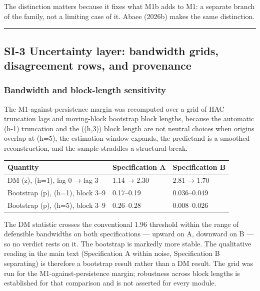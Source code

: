 \documentclass[11pt]{article}
\begin{document}
The distinction matters because it fixes what M1b adds to M1: a separate
branch of the family, not a limiting case of it. Abaee (2026b) makes the
same distinction.

\begin{center}\rule{0.5\linewidth}{0.5pt}\end{center}

\subsection{SI-3 Uncertainty layer: bandwidth grids, disagreement rows,
and
provenance}\label{si-3-uncertainty-layer-bandwidth-grids-disagreement-rows-and-provenance}

\subsubsection{Bandwidth and block-length
sensitivity}\label{bandwidth-and-block-length-sensitivity}

The M1-against-persistence margin was recomputed over a grid of HAC
truncation lags and moving-block bootstrap block lengths, because the
automatic (h-1) truncation and the (\max(h,3)) block length are not
neutral choices when origins overlap at (h=5), the estimation window
expands, the predictand is a smoothed reconstruction, and the sample
straddles a structural break.

{\def\LTcaptype{none} %
\begin{longtable}[]{@{}lll@{}}
\toprule\noalign{}
Quantity & Specification A & Specification B \\
\midrule\noalign{}
\endhead
\bottomrule\noalign{}
\endlastfoot
DM (z), (h=1), lag 0 → lag 3 & 1.14 → 2.30 & 2.81 → 1.70 \\
Bootstrap (p), (h=1), block 3--9 & 0.17--0.19 & 0.036--0.049 \\
Bootstrap (p), (h=5), block 3--9 & 0.26--0.28 & 0.008--0.026 \\
\end{longtable}
}

The DM statistic crosses the conventional 1.96 threshold within the
range of defensible bandwidths on both specifications --- upward on A,
downward on B --- so no verdict rests on it. The bootstrap is markedly
more stable. The qualitative reading in the main text (Specification A
within noise, Specification B separating) is therefore a bootstrap
result rather than a DM result. The grid was run for the
M1-against-persistence margin; robustness across block lengths is
established for that comparison and is not asserted for every module.
\end{document}
